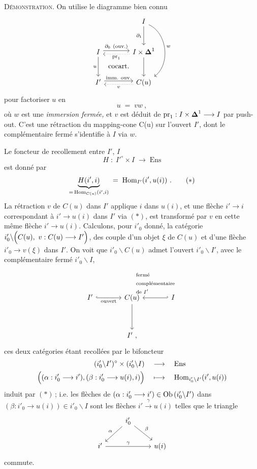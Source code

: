 \textsc{Démonstration.} On utilise le diagramme bien connu
\[
\begin{tikzcd}[row sep=large, column sep=large]
 & I \arrow[d, "\partial_1"'] \arrow[dd, bend left=60, "w"] \\
I \arrow[r, shift left, "\partial_0\ (\text{ouv.})"] \arrow[d, "u"'] \arrow[dr, phantom, "\text{cocart.}"] & I\times\boldsymbol{\Delta}^1 \arrow[l, dotted, shift left, "\pr_1"] \arrow[d] \\
I' \arrow[r, shift left, "\text{imm. ouv.}"] & C(u) \arrow[l, dotted, shift left, "v"]
\end{tikzcd}
\]
pour factoriser $u$ en
\[
u \;=\; vw\ ,
\]
où $w$ est une \textit{immersion fermée,} et $v$ est déduit de $\mathrm{pr}_1 : I\times\boldsymbol{\Delta}^1 \longrightarrow I$ par push-out. C'est une rétraction du mapping-cone C(u) sur l'ouvert $I'$, dont le complémentaire fermé s'identifie à $I$ via $w$.

Le foncteur de recollement entre $I'$, $I$
\[
H \;:\; I'^\circ\times I \;\longrightarrow\; \mathrm{Ens}
\]
est donné par
\[
\underbrace{H(i',i)}_{=\,\operatorname{Hom}_{C(u)}(i',i)} \;=\; \operatorname{Hom}_{I'}(i',u(i))\ . \tag*{$(*)$}
\]
La rétraction $v$ de $C(u)$ dans $I'$ applique $i$ dans $u(i)$, et une flèche $i'\longrightarrow i$ correspondant à $i'\longrightarrow u(i)$ dans $I'$ via $(*)$, est transformé par $v$ en cette même flèche $i'\longrightarrow u(i)$. Calculons, %
pour $i'_0$ donné, la catégorie $i'_0\backslash\Bigl(C(u),\ v : C(u)\longrightarrow I'\Bigr)$, des couple d'un objet $\xi$ de $C(u)$ %
et d'une flèche $i'_0\longrightarrow v(\xi)$ dans $I'$. On voit que $i'_0\backslash C(u)$ admet l'ouvert $i'_0\backslash I'$, avec le complémentaire fermé $i'_0\backslash I$,
\[
\begin{tikzcd}[column sep=large, row sep=huge]
I' \arrow[r, hook, "\text{ouvert}"'] & C(u) \arrow[d] & I \arrow[l, hook', "\begin{array}{l}\text{fermé}\\ \text{complémentaire}\\ \text{de } I'\end{array}"'] \\
 & I'\ ,
\end{tikzcd}
\]
ces deux catégories étant recollées par le bifoncteur
\[
\begin{aligned}
(i'_0\backslash I')^\circ \times (i'_0\backslash I) &\quad\longrightarrow\quad \mathrm{Ens}\\
\Bigl((\alpha : i'_0\longrightarrow i'), (\beta : i'_0\longrightarrow u(i), i)\Bigr) &\quad\longmapsto\quad \operatorname{Hom}_{i'_0\backslash I'}(i',u(i))
\end{aligned}
\]
induit par $(*)$\,; i.e. les flèches de $(\alpha : i'_0\longrightarrow i') \in \operatorname{Ob}\,(i'_0\backslash I')$ dans $(\beta : i'_0\longrightarrow u(i)) \in i'_0\backslash I$ sont les flèches $i' \xrightarrow{\gamma} u(i)$ telles que le triangle
\[
\begin{tikzcd}
 & i'_0 \arrow[dl, "\alpha"'] \arrow[dr, "\beta"] & \\
i' \arrow[rr, "\gamma"] & & u(i)
\end{tikzcd}
\]
commute.

